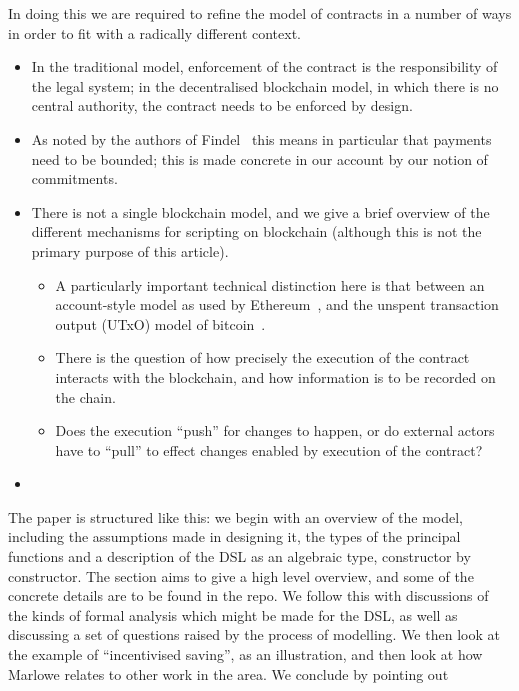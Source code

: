 \documentclass[
      acmsmall
    , screen
    , review=true
  ]{acmart}
\begin{document}
In doing this we are required to refine the model of contracts in a number of ways in order to fit with a radically different context. 
\begin{itemize}
\item In the traditional model, enforcement of the contract is the responsibility of the legal system; in the decentralised blockchain model, in which there is no central authority, the contract needs to be enforced by design. 
\item As noted by  the authors of Findel~\cite{findel} this means in particular that payments need to be bounded; this is made concrete in our account by our notion of commitments.
\item There is not a single blockchain model, and we give a brief overview of the different mechanisms for scripting on blockchain (although this is not the primary purpose of this article). 
\begin{itemize}
\item
A particularly important technical distinction here is that between an account-style model as used by Ethereum~\cite{EthereumRationale}, and the unspent transaction output (UTxO) model of bitcoin~\cite{sok}. 
\item There is the question of how precisely the execution of the contract interacts with the blockchain, and how information is to be recorded on the chain.
\item Does the execution ``push'' for changes  to happen, or do external actors have to ``pull'' to effect changes enabled by execution of the contract?
\end{itemize}
\item {}
\end{itemize}

\noindent
{}
The paper is structured like this: we begin with an overview of the model, including the assumptions made in designing 
it, the types of the principal functions and a description of the DSL as an algebraic type, constructor by constructor. 
The section aims to give a high level overview, and some of the concrete details are to be found in the repo. We follow 
this with discussions of the kinds of formal analysis which might be made for the DSL, as well as discussing a  set of 
questions raised by the process of modelling. We then look at the example of ``incentivised saving'', as an 
illustration, and then look at how Marlowe relates to other work in the area. We conclude by pointing out 
\end{document}
